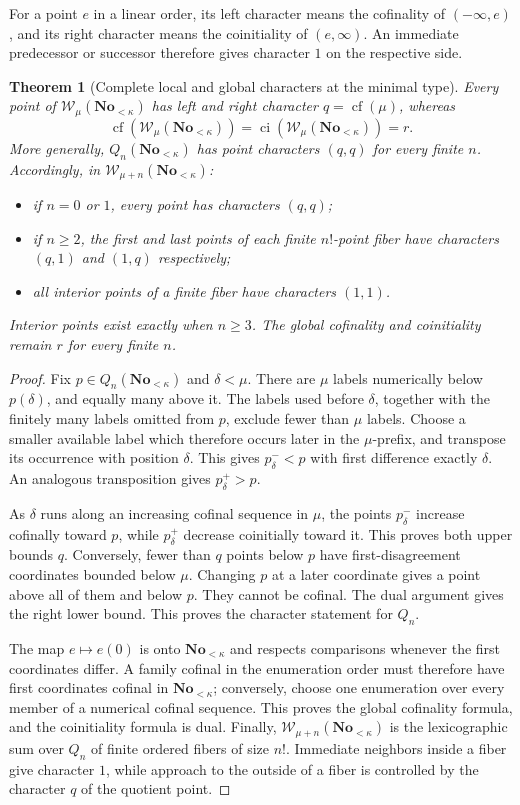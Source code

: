 \documentclass[11pt]{article}
\newtheorem{theorem}{Theorem}[section]
\theoremstyle{definition}
\theoremstyle{remark}
\newcommand{\No}{\mathbf{No}}
\newcommand{\WO}{\mathcal W}
\begin{document}
For a point $e$ in a linear order, its left character means the
cofinality of $(-\infty,e)$, and its right character means the
coinitiality of $(e,\infty)$.  An immediate predecessor or successor
therefore gives character $1$ on the respective side.

\begin{theorem}[Complete local and global characters at the minimal type]
\label{swo:sh:thm:new-minimal-characters}
Every point of $\WO_\mu(\No_{<\kappa})$ has left and right character
$q=\operatorname{cf}(\mu)$, whereas
\[
 \operatorname{cf}(\WO_\mu(\No_{<\kappa}))
 =\operatorname{ci}(\WO_\mu(\No_{<\kappa}))=r.
\]
More generally, $Q_n(\No_{<\kappa})$ has point characters $(q,q)$ for
every finite $n$.  Accordingly, in
$\WO_{\mu+n}(\No_{<\kappa})$:
\begin{itemize}
\item if $n=0$ or $1$, every point has characters $(q,q)$;
\item if $n\geq2$, the first and last points of each finite $n!$-point
      fiber have characters $(q,1)$ and $(1,q)$ respectively;
\item all interior points of a finite fiber have characters $(1,1)$.
\end{itemize}
Interior points exist exactly when $n\geq3$.  The global cofinality and
coinitiality remain $r$ for every finite $n$.
\end{theorem}

\begin{proof}
Fix $p\in Q_n(\No_{<\kappa})$ and $\delta<\mu$.  There are $\mu$ labels
numerically below $p(\delta)$, and equally many above it.  The labels
used before $\delta$, together with the finitely many labels omitted
from $p$, exclude fewer than $\mu$ labels.  Choose a smaller available
label which therefore occurs later in the $\mu$-prefix, and transpose
its occurrence with position $\delta$.  This gives $p^-_\delta<p$
with first difference exactly $\delta$.  An analogous transposition
gives $p^+_\delta>p$.

As $\delta$ runs along an increasing cofinal sequence in $\mu$, the
points $p^-_\delta$ increase cofinally toward $p$, while
$p^+_\delta$ decrease coinitially toward it.  This proves both upper
bounds $q$.  Conversely, fewer than $q$ points below $p$ have
first-disagreement coordinates bounded below $\mu$.  Changing $p$ at
a later coordinate gives a point above all of them and below $p$.
They cannot be cofinal.  The dual argument gives the right lower
bound.  This proves the character statement for $Q_n$.

The map $e\mapsto e(0)$ is onto $\No_{<\kappa}$ and respects comparisons
whenever the first coordinates differ.  A family cofinal in the
enumeration order must therefore have first coordinates cofinal in
$\No_{<\kappa}$; conversely, choose one enumeration over every member of
a numerical cofinal sequence.  This proves the global cofinality
formula, and the coinitiality formula is dual.  Finally,
$\WO_{\mu+n}(\No_{<\kappa})$ is the lexicographic sum over $Q_n$ of
finite ordered fibers of size $n!$.  Immediate neighbors inside a
fiber give character $1$, while approach to the outside of a fiber is
controlled by the character $q$ of the quotient point.
\end{proof}
\end{document}
